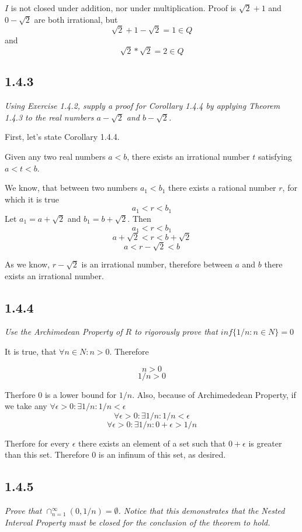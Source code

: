 \documentclass[11pt,oneside,titlepage]{book}
\begin{document}
$I$ is not closed under addition, nor under multiplication. Proof is
$\sqrt{2} + 1$ and $0 - \sqrt{2}$ are both irrational, but
$$\sqrt{2} + 1 - \sqrt{2} = 1 \in Q$$
and
$$\sqrt{2} * \sqrt{2} = 2 \in Q$$

\subsection*{1.4.3}
\textit{Using Exercise 1.4.2, supply a proof for Corollary 1.4.4 by
  applying Theorem 1.4.3 to the real numbers $a - \sqrt{2}$  and
  $b - \sqrt{2}$.}

First, let's state Corollary 1.4.4.

Given any two real numbers $a < b$, there exists an irrational number $t$
satisfying $a < t < b$.

We know, that between two numbers $a_1 < b_1$ there exists a rational number
$r$, for which it is true
$$a_1 < r < b_1$$
Let $a_1 = a + \sqrt{2}$ and $b_1 = b + \sqrt{2}$. Then
$$a_1 < r < b_1$$
$$a + \sqrt{2}  < r < b + \sqrt{2}$$
$$a  < r - \sqrt{2} < b $$

As we know, $r - \sqrt{2}$ is an irrational number, therefore between $a$ and
$b$ there exists an irrational number.

\subsection*{1.4.4}
\textit{Use the Archimedean Property of $R$ to rigorously prove that
  $inf\{1/n: n \in N\} = 0$}

It is true, that $\forall n \in N: n > 0$. Therefore

$$n > 0$$
$$1/n > 0$$

Therfore 0 is a lower bound for $1/n$. Also, because of Archimededean Property,
if we take any $\forall \epsilon > 0: \exists 1/n: 1/n < \epsilon $
$$\forall \epsilon > 0: \exists 1/n: 1/n < \epsilon $$
$$\forall \epsilon > 0: \exists 1/n: 0 + \epsilon > 1/n $$


Therfore for every $\epsilon$ there exists an element of a set such that
$0 + \epsilon$ is greater than this set. Therefore 0 is an infinum of this set,
as desired.

\subsection*{1.4.5}
\textit{Prove that $\cap^{\infty}_{n = 1}(0, 1/n) = \emptyset$. Notice that
  this demonstrates that the Nested Interval Property must be closed for the
  conclusion of the theorem to hold.}
\end{document}

